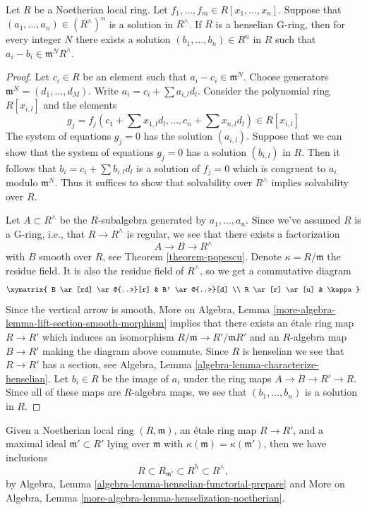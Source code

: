 \begin{theorem}
\label{theorem-approximation-property}
Let $R$ be a Noetherian local ring. Let
$f_1, \ldots, f_m \in R[x_1, \ldots, x_n]$.
Suppose that $(a_1, \ldots, a_n) \in (R^\wedge)^n$ is a solution
in $R^\wedge$. If $R$ is a henselian G-ring, then for every integer
$N$ there exists a solution $(b_1, \ldots, b_n) \in R^n$ in $R$ such that
$a_i - b_i \in \mathfrak m^NR^\wedge$.
\end{theorem}

\begin{proof}
Let $c_i \in R$ be an element such that $a_i - c_i \in \mathfrak m^N$.
Choose generators $\mathfrak m^N = (d_1, \ldots, d_M)$.
Write $a_i = c_i + \sum a_{i, l} d_l$.
Consider the polynomial ring $R[x_{i, l}]$ and the elements
$$
g_j = f_j(c_1 + \sum x_{1, l} d_l , \ldots, c_n + \sum x_{n, l} d_l)
\in R[x_{i, l}]
$$
The system of equations $g_j = 0$ has the solution $(a_{i, l})$.
Suppose that we can show that the system of equations $g_j = 0$ has a solution $(b_{i, l})$ in $R$.
Then it follows that $b_i = c_i + \sum b_{i, l}d_l$ is a solution
of $f_j = 0$ which is congruent to $a_i$ modulo $\mathfrak m^N$.
Thus it suffices to show that solvability over $R^\wedge$ implies
solvability over $R$.

\medskip\noindent
Let $A \subset R^\wedge$ be the $R$-subalgebra generated by
$a_1, \ldots, a_n$. Since we've assumed $R$ is a G-ring, i.e.,
that $R \to R^\wedge$ is regular, we see that
there exists a factorization
$$
A \to B \to R^\wedge
$$
with $B$ smooth over $R$, see Theorem \ref{theorem-popescu}.
Denote $\kappa = R/\mathfrak m$ the residue field. It is also
the residue field of $R^\wedge$, so we get a commutative diagram
$$
\xymatrix{
B \ar[rd] \ar@{..>}[r] & R' \ar@{..>}[d] \\
R \ar[r] \ar[u] & \kappa
}
$$
Since the vertical arrow is smooth,
More on Algebra, Lemma \ref{more-algebra-lemma-lift-section-smooth-morphism}
implies that there exists an \'etale ring map $R \to R'$
which induces an isomorphism $R/\mathfrak m \to R'/\mathfrak mR'$
and an $R$-algebra map $B \to R'$ making the diagram above commute.
Since $R$ is henselian we see that $R \to R'$ has a section, see
Algebra, Lemma \ref{algebra-lemma-characterize-henselian}.
Let $b_i \in R$ be the image of $a_i$ under the ring maps
$A \to B \to R' \to R$. Since all of these maps are $R$-algebra
maps, we see that $(b_1, \ldots, b_n)$ is a solution in $R$.
\end{proof}

\noindent
Given a Noetherian local ring $(R, \mathfrak m)$, an \'etale
ring map $R \to R'$, and a maximal ideal $\mathfrak m' \subset R'$
lying over $\mathfrak m$ with $\kappa(\mathfrak m) = \kappa(\mathfrak m')$,
then we have inclusions
$$
R \subset R_{\mathfrak m'} \subset R^h \subset R^\wedge,
$$
by Algebra, Lemma \ref{algebra-lemma-henselian-functorial-prepare} and
More on Algebra, Lemma \ref{more-algebra-lemma-henselization-noetherian}.


